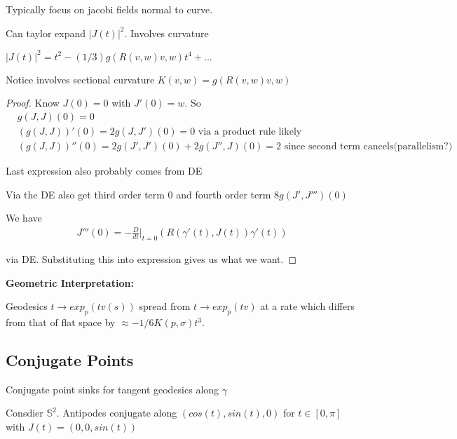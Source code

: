 \documentclass[11pt]{article}
\begin{document}
\begin{theme}
	Typically focus on jacobi fields normal to curve. 
\end{theme}

\begin{prop}
	Can taylor expand $|J(t)|^2$. Involves curvature

	$|J(t)|^2 = t^2 - (1/3)g(R(v,w)v,w)t^4 + ...$

	Notice involves sectional curvature $K(v,w) = g(R(v,w)v,w)$
\end{prop}

\begin{proof}
	Know $J(0) = 0$ with $J'(0) = w$. So 
	\begin{align*}
		&g(J,J)(0) = 0\\
		&(g(J,J))'(0) = 2g(J,J')(0) = 0 \text{ via a product rule likely}\\
		& (g(J,J))''(0) = 2g(J',J')(0) + 2 g(J'',J)(0) = 2 \text{ since second term cancels(parallelism?)}
	\end{align*}

	Last expression also probably comes from DE

	Via the DE also get third order term 0 and fourth order term $8g(J',J''')(0)$

	We have
	\begin{align*}
		J'''(0) = -\frac{D}{dt}|_{t =0}(R(\gamma'(t),J(t))\gamma'(t))
	\end{align*}

	via DE. Substituting this into expression gives us what we want.


\end{proof}

\begin{remark}
	\textbf{Geometric Interpretation:}

	Geodesics $t \to exp_p(tv(s))$ spread from $t \to exp_p(tv)$ at a rate which differs from that of flat space by $\approx-1/6 K(p,\sigma)t^3$.
\end{remark}

\subsection{Conjugate Points}

\begin{remark}
	Conjugate point sinks for tangent geodesics along $\gamma$
\end{remark}

\begin{example}
	Consdier $\mathbb{S}^2$. Antipodes conjugate along $(cos(t),sin(t),0)$ for $t \in [0,\pi]$ with $J(t) = (0,0,sin(t))$
\end{example}
\end{document}
